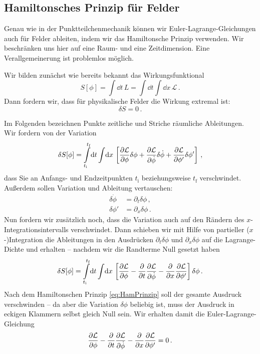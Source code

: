 \documentclass[paper=a4, fontsize=11.0pt, abstractoff, DIV12]{scrartcl}
\newcommand{\LD}{\ensuremath{\mathcal{L}}}
\newcommand{\ti}{\ensuremath{t_\mathrm{i}}}
\newcommand{\tf}{\ensuremath{t_\mathrm{f}}}
\begin{document}
\subsection{Hamiltonsches Prinzip für Felder}

Genau wie in der Punktteilchenmechanik können wir Euler-Lagrange-Gleichungen
auch für Felder ableiten, indem wir das Hamiltonsche Prinzip verwenden. Wir
beschränken uns hier auf eine Raum- und eine Zeitdimension. Eine
Verallgemeinerung ist problemlos möglich.

Wir bilden zunächst wie bereits bekannt das Wirkungsfunktional
\begin{equation}
S[\phi] = \int\!\dd t \,L = \int\!\dd t\int\!\dd x\,\LD\,.
\end{equation}
Dann fordern wir, dass für physikalische Felder die Wirkung extremal ist:
\begin{equation}
\delta S = 0\,.
\label{eq:HamPrinzip}
\end{equation}

Im Folgenden bezeichnen Punkte zeitliche und Striche räumliche Ableitungen.
Wir fordern von der Variation
\begin{equation}
\delta S[\phi] = \int\limits_{\ti}^{\tf}\!\dd t\int\!\dd x\,\left[\firstpderiv{\LD}{\phi}\delta\phi+\firstpderiv{\LD}{\dot{\phi}}\delta\dot{\phi}+\firstpderiv{\LD}{\phi'}\delta \phi' \right]\,,
\end{equation}
dass Sie an Anfangs- und Endzeitpunkten $\ti$ beziehungsweise $\tf$
verschwindet. Außerdem sollen Variation und Ableitung vertauschen:
\begin{align}
\delta\dot{\phi} &= \partial_t\delta\phi\,,\\
\delta\phi' &= \partial_x\delta\phi\,.
\end{align}
Nun fordern wir zusätzlich noch, dass die Variation auch auf den Rändern des
$x$-Integrations\-in\-ter\-valls verschwindet. Dann schieben wir mit Hilfe
von partieller ($x$-)Integration die Ableitungen in den Ausdrücken
$\partial_t\delta\phi$ und $\partial_x\delta\phi$ auf die Lagrange-Dichte
und erhalten -- nachdem wir die Randterme Null gesetzt haben
\begin{equation}
\delta S[\phi] = \int\limits_{\ti}^{\tf}\!\dd t\int\!\dd x\,\left[\firstpderiv{\LD}{\phi} - \firstpderiv{}{t}\firstpderiv{\LD}{\dot{\phi}} - \firstpderiv{}{x}\firstpderiv{\LD}{\phi'} \right]\delta{\phi}\,.
\end{equation}
Nach dem Hamiltonschen Prinzip \eqref{eq:HamPrinzip} soll der gesamte Ausdruck
verschwinden -- da aber die Variation $\delta\phi$ beliebig ist, muss der
Ausdruck in eckigen Klammern selbst gleich Null sein. Wir erhalten damit die
Euler-Lagrange-Gleichung
\begin{equation}
\firstpderiv{\LD}{\phi} - \firstpderiv{}{t}\firstpderiv{\LD}{\dot{\phi}} - \firstpderiv{}{x}\firstpderiv{\LD}{\phi'} = 0\,.
\label{eq:ELG}
\end{equation}
\end{document}
